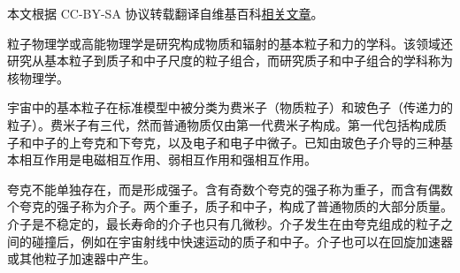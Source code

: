 
本文根据 CC-BY-SA 协议转载翻译自维基百科\href{https://en.wikipedia.org/wiki/Particle_physics}{相关文章}。

粒子物理学或高能物理学是研究构成物质和辐射的基本粒子和力的学科。该领域还研究从基本粒子到质子和中子尺度的粒子组合，而研究质子和中子组合的学科称为核物理学。

宇宙中的基本粒子在标准模型中被分类为费米子（物质粒子）和玻色子（传递力的粒子）。费米子有三代，然而普通物质仅由第一代费米子构成。第一代包括构成质子和中子的上夸克和下夸克，以及电子和电子中微子。已知由玻色子介导的三种基本相互作用是电磁相互作用、弱相互作用和强相互作用。

夸克不能单独存在，而是形成强子。含有奇数个夸克的强子称为重子，而含有偶数个夸克的强子称为介子。两个重子，质子和中子，构成了普通物质的大部分质量。介子是不稳定的，最长寿命的介子也只有几微秒。介子发生在由夸克组成的粒子之间的碰撞后，例如在宇宙射线中快速运动的质子和中子。介子也可以在回旋加速器或其他粒子加速器中产生。